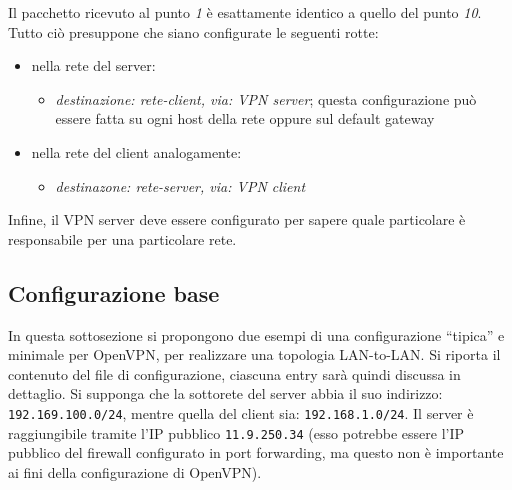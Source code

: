 Il pacchetto ricevuto al punto \textit{1} è esattamente identico a quello del
punto \textit{10}.
Tutto ciò presuppone che siano configurate le seguenti rotte:
\begin{itemize}
	\item nella rete del server:
	      \begin{itemize}
	      	\item \textit{destinazione: rete-client, via: VPN server}; questa configurazione
	      	      può essere fatta su ogni host della rete oppure sul default gateway
	      \end{itemize}
	\item nella rete del client analogamente:
	      \begin{itemize}
	      	\item \textit{destinazone: rete-server, via: VPN client}
	      \end{itemize}
\end{itemize}
Infine, il VPN server deve essere configurato per sapere quale particolare è
responsabile per una particolare rete.


\subsection{Configurazione base}
In questa sottosezione si propongono due esempi di una configurazione ``tipica''
e minimale per OpenVPN, per realizzare una topologia LAN-to-LAN. Si riporta il
contenuto del file di configurazione, ciascuna entry sarà quindi discussa in dettaglio.
Si supponga che la sottorete del server abbia il suo indirizzo: \texttt{192.169.100.0/24},
mentre quella del client sia: \texttt{192.168.1.0/24}. Il server è raggiungibile
tramite l'IP pubblico \texttt{11.9.250.34} (esso potrebbe essere l'IP pubblico del firewall
configurato in port forwarding, ma questo non è importante ai fini della configurazione
di OpenVPN).

